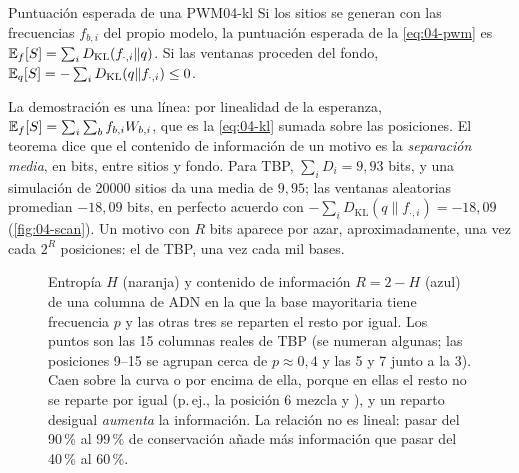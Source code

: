 \begin{teorema}{Puntuación esperada de una PWM}{04-kl}
Si los sitios se generan con las frecuencias $f_{b,i}$ del propio modelo, la puntuación esperada de la \cref{eq:04-pwm} es $\mathbb{E}_f[S]=\sum_{i} D_{\mathrm{KL}}(f_{\cdot,i}\|q)$. Si las ventanas proceden del fondo, $\mathbb{E}_q[S]=-\sum_i D_{\mathrm{KL}}(q\|f_{\cdot,i})\le 0$.
\end{teorema}

La demostración es una línea: por linealidad de la esperanza, $\mathbb{E}_f[S]=\sum_i\sum_b f_{b,i}W_{b,i}$, que es la \cref{eq:04-kl} sumada sobre las posiciones. El teorema dice que el contenido de información de un motivo es la \emph{separación media}, en bits, entre sitios y fondo. Para TBP, $\sum_i D_i=9{,}93$ bits, y una simulación de \num{20000} sitios da una media de $9{,}95$; las ventanas aleatorias promedian $-18{,}09$ bits, en perfecto acuerdo con $-\sum_iD_{\mathrm{KL}}(q\|f_{\cdot,i})=-18{,}09$ (\cref{fig:04-scan}). Un motivo con $R$ bits aparece por azar, aproximadamente, una vez cada $2^{R}$ posiciones: el de TBP, una vez cada mil bases.

\begin{figure}[tbp]
\centering
{}
\caption[Entropía e información de una columna]{Entropía $H$ (naranja) y contenido de información $R=2-H$ (azul) de una columna de ADN en la que la base mayoritaria tiene frecuencia $p$ y las otras tres se reparten el resto por igual. Los puntos son las 15 columnas reales de TBP (se numeran algunas; las posiciones 9--15 se agrupan cerca de $p\approx0{,}4$ y las 5 y 7 junto a la 3). Caen sobre la curva o por encima de ella, porque en ellas el resto no se reparte por igual (p.\,ej., la posición 6 mezcla  y ), y un reparto desigual \emph{aumenta} la información. La relación no es lineal: pasar del 90\,\% al 99\,\% de conservación añade más información que pasar del 40\,\% al 60\,\%.}
\label{fig:04-entropia}
\end{figure}

